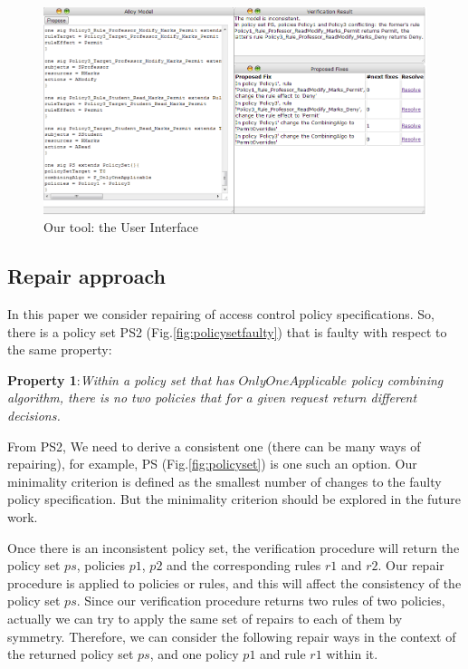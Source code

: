 \documentclass[letterpaper]{acm_proc_article-sp}
\begin{document}
\begin{figure}[ht]
\includegraphics[width=\textwidth]{tool.png}
\caption{Our tool: the User Interface}    
  \label{fig:tool}
\end{figure}

\subsection{Repair approach}

In this paper we consider repairing of access control policy specifications. So, there is a policy set PS2 (Fig.\ref{fig:policysetfaulty}) that is faulty with respect to the same property:

\textbf{Property 1}:\textit{Within a policy set that has $OnlyOneApplicable$ policy combining algorithm, there is no two policies that for a given request return different decisions.}

From PS2, We need to derive a consistent one (there can be many ways of repairing), for example, PS (Fig.\ref{fig:policyset}) is one such an option. Our minimality criterion is defined as the smallest number of changes to the faulty policy specification. But the minimality criterion should be explored in the future work.

Once there is an inconsistent policy set, the verification procedure will return the policy set $ps$, policies $p1$, $p2$ and the corresponding rules $r1$ and $r2$. Our repair procedure is applied to policies or rules, and this will affect the consistency of the policy set $ps$. Since our verification procedure returns two rules of two policies, actually we can try to apply the same set of repairs to each of them by symmetry. Therefore, we can consider the following repair ways in the context of the returned policy set $ps$, and one policy $p1$ and rule $r1$ within it.
\end{document}

